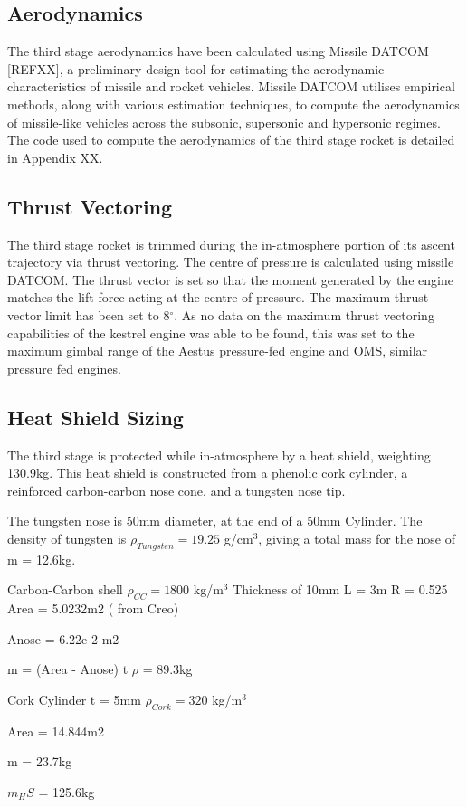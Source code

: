 		
		
		
		
		
		\subsection{Aerodynamics}
		
		The third stage aerodynamics have been calculated using Missile DATCOM [REFXX], a preliminary design tool for estimating the aerodynamic characteristics of missile and rocket vehicles. Missile DATCOM utilises empirical methods, along with various estimation techniques, to compute the aerodynamics of missile-like vehicles across the subsonic, supersonic and hypersonic regimes.  The code used to compute the aerodynamics of the third stage rocket is detailed in Appendix XX.  
		
		\subsection{Thrust Vectoring}
		
		The third stage rocket is trimmed during the in-atmosphere portion of its ascent trajectory via thrust vectoring. The centre of pressure is calculated using missile DATCOM. The thrust vector is set so that the moment generated by the engine matches the lift force acting at the centre of pressure. The maximum thrust vector limit has been set to 8$^\circ$. As no data on the maximum thrust vectoring capabilities of the kestrel engine was able to be found, this was set to the maximum gimbal range of the Aestus pressure-fed engine and OMS, similar pressure fed engines. 
		
		
		\subsection{Heat Shield Sizing}
		
			The third stage is protected while in-atmosphere by a heat shield, weighting 130.9kg. This heat shield is constructed from a phenolic cork cylinder, a reinforced carbon-carbon nose cone, and a tungsten nose tip. 
		
		
		The tungsten nose is 50mm diameter, at the end of a 50mm Cylinder. The density of tungsten is $\rho_{Tungsten} = 19.25$  g/cm$^3$, giving a total mass for the nose of m = 12.6kg.
		
		Carbon-Carbon shell
		$\rho_{CC} = 1800$  kg/m$^3$
		Thickness of 10mm
		L = 3m
		R = 0.525
		Area = 5.0232m2 ( from Creo)
		
		Anose = 6.22e-2 m2
		
		m = (Area - Anose) t $\rho$ = 89.3kg
		
		
		Cork Cylinder
		t = 5mm
		$\rho_{Cork} = 320$  kg/m$^3$
		
		Area = 14.844m2
		
		m = 23.7kg
		
		
		$m_HS$ = 125.6kg
		
